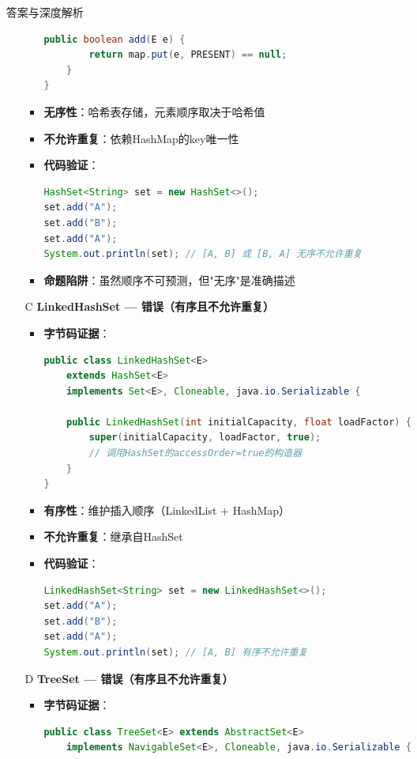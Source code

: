 \documentclass[12pt, a4paper]{ctexart}
\begin{document}
\begin{enumerate}[label=\textbf{\arabic*.}]
\begin{bluebox}{答案与深度解析}
\begin{itemize}[leftmargin=*, nosep, label={}]
\begin{itemize}[label={}, leftmargin=*, nosep]
\begin{lstlisting}[language=Java]
    public boolean add(E e) {
        return map.put(e, PRESENT) == null;
    }
}
				      \end{lstlisting}
				            \item \textbf{无序性}：哈希表存储，元素顺序取决于哈希值
				            \item \textbf{不允许重复}：依赖HashMap的key唯一性
				            \item \textbf{代码验证}：
				                  \begin{lstlisting}[language=Java]
HashSet<String> set = new HashSet<>();
set.add("A");
set.add("B");
set.add("A");
System.out.println(set); // [A, B] 或 [B, A] 无序不允许重复
				      \end{lstlisting}
				            \item \textbf{命题陷阱}：虽然顺序不可预测，但"无序"是准确描述
			            \end{itemize}

			      \item[C] \textbf{LinkedHashSet — 错误（有序且不允许重复）}
			            \begin{itemize}[label={}, leftmargin=*, nosep]
				            \item \textbf{字节码证据}：
				                  \begin{lstlisting}[language=Java]
public class LinkedHashSet<E>
    extends HashSet<E>
    implements Set<E>, Cloneable, java.io.Serializable {

    public LinkedHashSet(int initialCapacity, float loadFactor) {
        super(initialCapacity, loadFactor, true);
        // 调用HashSet的accessOrder=true的构造器
    }
}
				      \end{lstlisting}
				            \item \textbf{有序性}：维护插入顺序（LinkedList + HashMap）
				            \item \textbf{不允许重复}：继承自HashSet
				            \item \textbf{代码验证}：
				                  \begin{lstlisting}[language=Java]
LinkedHashSet<String> set = new LinkedHashSet<>();
set.add("A");
set.add("B");
set.add("A");
System.out.println(set); // [A, B] 有序不允许重复
				      \end{lstlisting}
			            \end{itemize}

			      \item[D] \textbf{TreeSet — 错误（有序且不允许重复）}
			            \begin{itemize}[label={}, leftmargin=*, nosep]
				            \item \textbf{字节码证据}：
				                  \begin{lstlisting}[language=Java]
public class TreeSet<E> extends AbstractSet<E>
    implements NavigableSet<E>, Cloneable, java.io.Serializable {


\end{lstlisting}
\end{itemize}
\end{itemize}
\end{bluebox}
\end{enumerate}
\end{document}
